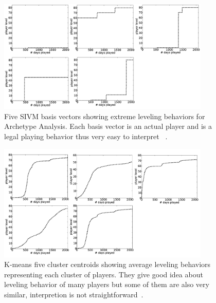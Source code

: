 \begin{figure}[here]
\centerline{\includegraphics[width=0.9\textwidth]{Figures/sivmbasis.png}}
\caption{Five SIVM basis vectors showing extreme leveling behaviors for Archetype Analysis. Each basis vector is an actual player and is a legal playing behavior thus very easy to interpret ~\citep{Drachen:2013}.}
\label{fig:sivmbasis}
\end{figure}


\begin{figure}[here]
\centerline{\includegraphics[width=0.9\textwidth]{Figures/kmeansbasis.png}}
\caption{K-means five cluster centroids showing average leveling behaviors representing each cluster of players. They give good idea about leveling behavior of many players but some of them are also very similar, interpretion is not straightforward~\citep{Drachen:2013}. }
\label{fig:kmeansbasis}
\end{figure}


